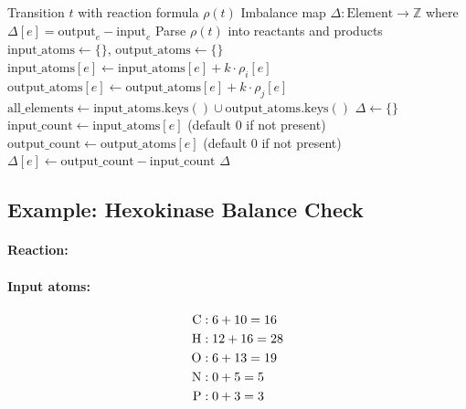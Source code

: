 \begin{algorithm}[htbp]
\caption{Verify elemental balance for transition}
\label{alg:verify-balance}
\begin{algorithmic}[1]
\Require Transition $t$ with reaction formula $\rho(t)$
\Ensure Imbalance map $\Delta: \text{Element} \to \mathbb{Z}$ where $\Delta[e] = \text{output}_e - \text{input}_e$
\State Parse $\rho(t)$ into reactants and products
\State $\text{input\_atoms} \gets \{\}$, $\text{output\_atoms} \gets \{\}$
 
        \State $\text{input\_atoms}[e] \gets \text{input\_atoms}[e] + k \cdot \rho_i[e]$
    \EndFor
\EndFor
{}
        \State $\text{output\_atoms}[e] \gets \text{output\_atoms}[e] + k \cdot \rho_j[e]$
    \EndFor
\EndFor
\State $\text{all\_elements} \gets \text{input\_atoms}.\text{keys}() \cup \text{output\_atoms}.\text{keys}()$
\State $\Delta \gets \{\}$
    \State $\text{input\_count} \gets \text{input\_atoms}[e]$ (default 0 if not present)
    \State $\text{output\_count} \gets \text{output\_atoms}[e]$ (default 0 if not present)
        \State $\Delta[e] \gets \text{output\_count} - \text{input\_count}$
    \EndIf
\EndFor
\State \Return $\Delta$ 
\end{algorithmic}
\end{algorithm}

\subsection{Example: Hexokinase Balance Check}
\label{subsec:hexokinase-balance}

\paragraph{Reaction:} 

\paragraph{Input atoms:}
\begin{align}
\ce{C} &: 6 + 10 = 16 \\
\ce{H} &: 12 + 16 = 28 \\
\ce{O} &: 6 + 13 = 19 \\
\ce{N} &: 0 + 5 = 5 \\
\ce{P} &: 0 + 3 = 3
\end{align}

